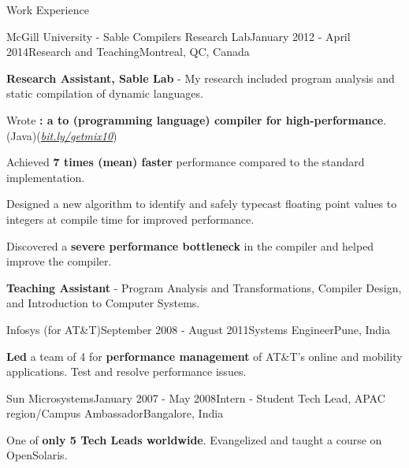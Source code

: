 \documentclass{resume} %
\begin{document}
\begin{rSection}{Work Experience}
\begin{rSubsection}{McGill University - Sable Compilers Research Lab}{January
        2012 - April 2014}{Research and Teaching}{Montreal, QC, Canada} 
\item \textbf{Research Assistant, Sable Lab} - My research included program
        analysis and static compilation of dynamic languages.

\begin{lsubSubsection}
\item Wrote \textbf{\mixtenx: a \matlab to \xten (programming language) compiler for
        high-performance}. (Java)(\href{http://bit.ly/getmix10}{\em{bit.ly/getmix10}})  
\item Achieved \textbf{7 times (mean) faster} performance compared to the
        standard \matlab implementation.
\item Designed a new algorithm to identify and safely typecast
        floating point values to integers at compile time for improved
        performance.
\item Discovered a \textbf{severe performance bottleneck} in the \xten compiler
        and helped improve the \xten compiler.  
\end{lsubSubsection}
\item \textbf{Teaching Assistant} - Program Analysis and Transformations,
	Compiler Design, and Introduction to Computer Systems.
\end{rSubsection}

\begin{rSubsection}{Infosys (for AT\&T)}{September 2008 - August
        2011}{Systems Engineer}{Pune, India}
\item \textbf{Led} a team of 4 for \textbf{performance management}
	of AT\&T's online and mobility applications. Test and resolve performance issues.
\end{rSubsection}

\begin{rSubsection}{Sun Microsystems}{January 2007 - May 2008}{Intern - Student
        Tech Lead, APAC region/Campus Ambassador}{Bangalore, India}
\item One of \textbf{only 5 Tech Leads worldwide}. Evangelized and taught a course on OpenSolaris.  
\end{rSubsection}
\end{rSection}
\end{document}
